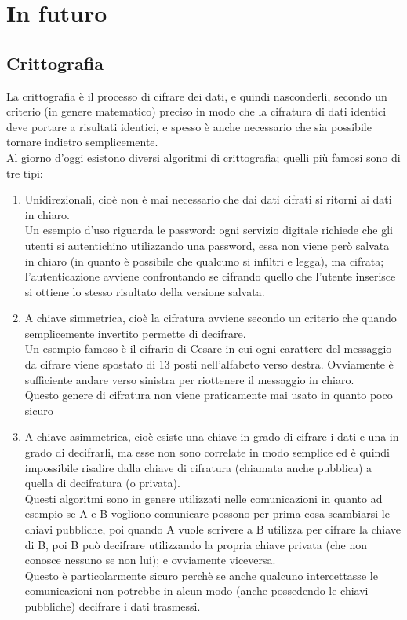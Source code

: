 \section{In futuro}
\subsection{Crittografia}
La crittografia è il processo di cifrare dei dati, e quindi nasconderli, secondo un criterio (in genere matematico) preciso in modo che la cifratura di dati identici deve portare a risultati identici, e spesso è anche necessario che sia possibile tornare indietro semplicemente.\\
Al giorno d'oggi esistono diversi algoritmi di crittografia; quelli più famosi sono di tre tipi:
\begin{enumerate}
\item Unidirezionali, cioè non è mai necessario che dai dati cifrati si ritorni ai dati in chiaro.\\
Un esempio d'uso riguarda le password: ogni servizio digitale richiede che gli utenti si autentichino utilizzando una password, essa non viene però salvata in chiaro (in quanto è possibile che qualcuno si infiltri e legga), ma cifrata; l'autenticazione avviene confrontando se cifrando quello che l'utente inserisce si ottiene lo stesso risultato della versione salvata.
\item A chiave simmetrica, cioè la cifratura avviene secondo un criterio che quando semplicemente invertito permette di decifrare.\\
Un esempio famoso è il cifrario di Cesare in cui ogni carattere del messaggio da cifrare viene spostato di 13 posti nell'alfabeto verso destra. Ovviamente è sufficiente andare verso sinistra per riottenere il messaggio in chiaro.\\
Questo genere di cifratura non viene praticamente mai usato in quanto poco sicuro
\item A chiave asimmetrica, cioè esiste una chiave in grado di cifrare i dati e una in grado di decifrarli, ma esse non sono correlate in modo semplice ed è quindi impossibile risalire dalla chiave di cifratura (chiamata anche pubblica) a quella di decifratura (o privata).\\
Questi algoritmi sono in genere utilizzati nelle comunicazioni in quanto ad esempio se A e B vogliono comunicare possono per prima cosa scambiarsi le chiavi pubbliche, poi quando A vuole scrivere a B utilizza per cifrare la chiave di B, poi B può decifrare utilizzando la propria chiave privata (che non conosce nessuno se non lui); e ovviamente viceversa.\\
Questo è particolarmente sicuro perchè se anche qualcuno intercettasse le comunicazioni non potrebbe in alcun modo (anche possedendo le chiavi pubbliche) decifrare i dati trasmessi.
\end{enumerate}
